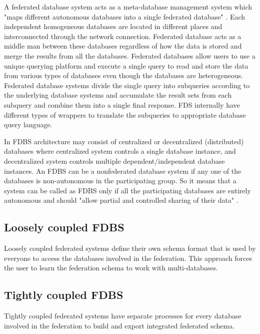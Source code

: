 	A federated database system acts as a meta-database management system which "maps different autonomous databases into a single federated database" \cite{misc10}.  Each independent homogeneous databases are located in different places and interconnected through the network connection. Federated database acts as a middle man between these databases regardless of how the data is stored and merge the results from all the databases. Federated databases allow users to use a unique querying platform and execute a single query to read and store the data from various types of databases even though the databases are heterogeneous. Federated database systems divide the single query into subqueries according to the underlying database systems and accumulate the result sets from each subquery and combine them into a single final response.  FDS internally have different types of wrappers to translate the subqueries to appropriate database query language.
	
	In FDBS architecture may consist of centralized or decentralized (distributed) databases where centralized system controls a single database instance, and decentralized system controls multiple dependent/independent database instances. An FDBS can be a nonfederated database system if any one of the databases is non-autonomous in the participating group. So it means that a system can be called as FDBS only if all the participating databases are entirely autonomous and should "allow partial and controlled sharing of their data" \cite{misc10}.
	
	\subsection{Loosely coupled FDBS}
	
	Loosely coupled federated systems define their own schema format that is used by everyone to access the databases involved in the federation. This approach forces the user to learn the federation schema to work with multi-databases.

	\subsection{Tightly coupled FDBS}
	
	Tightly coupled federated systems have separate processes for every database involved in the federation to build and export integrated federated schema.
	
